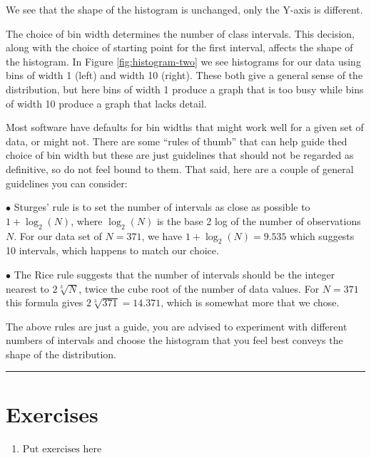 \documentclass[
]{book}
\providecommand{\tightlist}{%
  \setlength{\itemsep}{0pt}\setlength{\parskip}{0pt}}
\begin{document}
We see that the shape of the histogram is unchanged, only the Y-axis is
different.

The choice of bin width determines the number of class intervals.
This decision, along with the choice of starting point for the first interval,
affects the shape of the histogram. In Figure \ref{fig:histogram-two} we see
histograms for our data using bins of width 1 (left) and width 10 (right).
These both give a general sense of the distribution, but here bins of width 1
produce a graph that is too busy while bins of width 10 produce a graph that
lacks detail.

Most software have defaults for bin widths that might work well for a given set
of data, or might not. There are some ``rules of thumb'' that can help guide
thed choice of bin width but these are just guidelines that should not be
regarded as definitive, so do not feel bound to them. That said, here are
a couple of general guidelines you can consider:

\(\bullet\) Sturges' rule is to set the number of intervals as close as possible to
\(1 + \log_2(N)\), where \(\log_2(N)\) is the base 2 log of the number of
observations \(N\). For our data set of \(N = 371\), we have \(1 + \log_2(N) = 9.535\)
which suggests 10 intervals, which happens to match our choice.

\(\bullet\) The Rice rule suggests that the number of intervals should be the integer
nearest to \(2\sqrt[3]{N}\), twice the cube root of the number of data values.
For \(N = 371\) this formula gives \(2\sqrt[3]{371} = 14.371\), which is somewhat more
that we chose.

The above rules are just a guide, you are advised to experiment with different
numbers of intervals and choose the histogram that you feel best conveys the
shape of the distribution.

\begin{center}\rule{0.5\linewidth}{0.5pt}\end{center}

\hypertarget{exercises-3}{%
\section{Exercises}\label{exercises-3}}

\begin{enumerate}
\def\labelenumi{\arabic{enumi}.}
\tightlist
\item
  \(\text{Put exercises here}\)
\end{enumerate}
\end{document}
